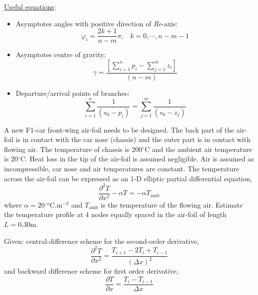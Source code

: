 \documentclass[calculator,datasheet,resit]{exam}
\newcommand{\frc}{\displaystyle\frac}
\begin{document}
\begin{question}
\begin{enumerate}[(a)]
\end{enumerate}




\underline{Useful equations}: 
\begin{itemize}
\item Asymptotes angles with positive direction of {\it Re}-axis: 
\begin{displaymath}
\varphi_{i} = \frc{2k + 1}{n -m}\pi,\;\;\;k=0,\cdots,n-m-1
\end{displaymath}

\item Asymptotes centre of gravity:
\begin{displaymath}
\gamma=\frc{\left[\sum\limits_{i=1}^{n}p_{i}-\sum\limits_{j=1}^{m}z_{i}\right]}{(n-m)}
\end{displaymath}

\item Departure/arrival points of branches: 
\begin{displaymath}
\sum\limits_{i=1}^{n}\frc{1}{\left(s_{0}-p_{i}\right)}=\sum\limits_{j=1}^{m}\frc{1}{\left(s_{0}-z_{j}\right)}
\end{displaymath} 
\end{itemize}


\end{question}


\clearpage


\begin{question} 
A new F1-car front-wing air-foil needs to be designed. The back part of the air-foil is in contact with the car nose (chassis) and the outer part is in contact with flowing air. The temperature of chassis is 200$^{\circ}$C and the ambient air temperature is 20$^{\circ}$C. Heat loss in the tip of the air-foil is assumed negligible. Air is assumed as incompressible, car nose and air temperatures are constant. The temperature across the air-foil can be expressed as an 1-D elliptic partial differential equation,
\begin{displaymath}
\frc{\partial^{2} T}{\partial x^{2}} -\alpha T = -\alpha T_{\text{amb}}
\end{displaymath} 
where $\alpha=20\;^{\text{o}}$C.m$^{-2}$ and $T_{\text{amb}}$ is the temperature of the flowing air. Estimate the temperature profile at 4 nodes equally spaced in the air-foil of length $L=0.30$m.~


Given: central-difference scheme for the second-order derivative,
\begin{displaymath}
\frc{\partial^{2} T}{\partial x^{2}} = \frc{T_{i+1}-2T_{i}+T_{i-1}}{\left(\Delta x\right)^{2}}
\end{displaymath}
and backward difference scheme for first order derivative,
\begin{displaymath}
\frc{\partial T}{\partial x} = \frc{T_{i}-T_{i-1}}{\Delta x}
\end{displaymath}
\end{question}
 
\end{document}
